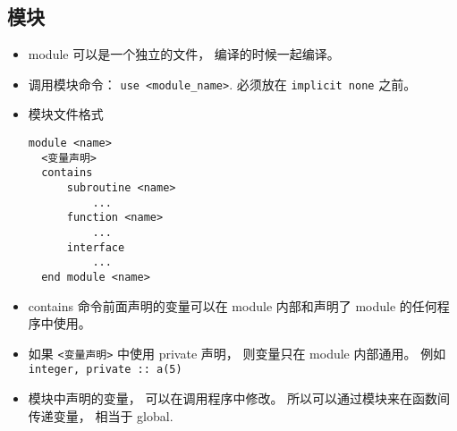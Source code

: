 \subsection{模块}

\begin{itemize}
\item module 可以是一个独立的文件， 编译的时候一起编译。
\item 调用模块命令：  \verb`use <module_name>`.  必须放在 \verb`implicit none` 之前。
\item 模块文件格式
\begin{lstlisting}[language=none]
  module <name>
  <变量声明>
  contains
      subroutine <name>
          ...
      function <name>
          ...
      interface
          ...
  end module <name>
\end{lstlisting}
\item contains 命令前面声明的变量可以在 module 内部和声明了 module 的任何程序中使用。
\item 如果 \verb`<变量声明>` 中使用 private 声明， 则变量只在 module 内部通用。 例如
   \verb`integer, private :: a(5)`
\item 模块中声明的变量， 可以在调用程序中修改。 所以可以通过模块来在函数间传递变量， 相当于 global.
\end{itemize}
